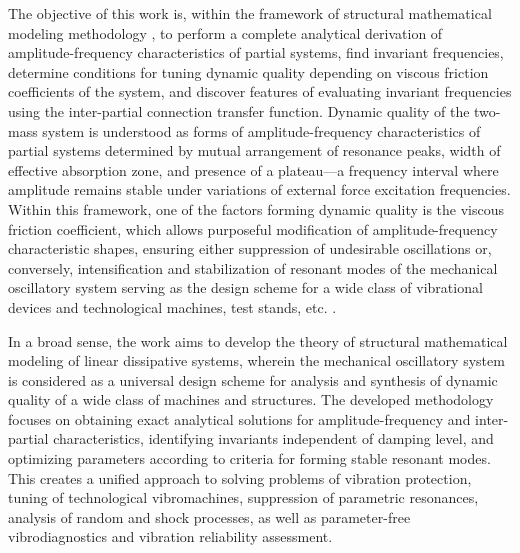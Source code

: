 \documentclass[12pt, a4paper]{article}
\begin{document}
	The objective of this work is, within the framework of structural mathematical modeling methodology \cite{Eliseev2020, Eliseev2023}, to perform a complete analytical derivation of amplitude-frequency characteristics of partial systems, find invariant frequencies, determine conditions for tuning dynamic quality depending on viscous friction coefficients of the system, and discover features of evaluating invariant frequencies using the inter-partial connection transfer function. Dynamic quality of the two-mass system is understood as forms of amplitude-frequency characteristics of partial systems determined by mutual arrangement of resonance peaks, width of effective absorption zone, and presence of a plateau---a frequency interval where amplitude remains stable under variations of external force excitation frequencies. Within this framework, one of the factors forming dynamic quality is the viscous friction coefficient, which allows purposeful modification of amplitude-frequency characteristic shapes, ensuring either suppression of undesirable oscillations or, conversely, intensification and stabilization of resonant modes of the mechanical oscillatory system serving as the design scheme for a wide class of vibrational devices and technological machines, test stands, etc. \cite{Svyshch2025, Kapalo2025}.
	
	In a broad sense, the work aims to develop the theory of structural mathematical modeling of linear dissipative systems, wherein the mechanical oscillatory system is considered as a universal design scheme for analysis and synthesis of dynamic quality of a wide class of machines and structures. The developed methodology focuses on obtaining exact analytical solutions for amplitude-frequency and inter-partial characteristics, identifying invariants independent of damping level, and optimizing parameters according to criteria for forming stable resonant modes. This creates a unified approach to solving problems of vibration protection, tuning of technological vibromachines, suppression of parametric resonances, analysis of random and shock processes, as well as parameter-free vibrodiagnostics and vibration reliability assessment.
	
\end{document}
